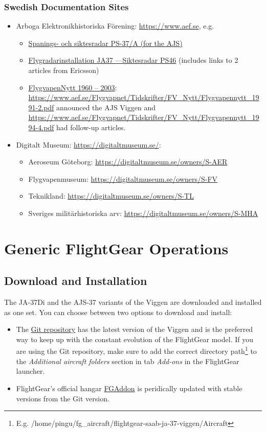 \subsection{Swedish Documentation Sites}
\begin{itemize}
\item Arboga Elektronikhistoriska Förening: \url{https://www.aef.se}, e.g. 
\begin{itemize}
\item \href{https://www.aef.se/Avionik/Notiser/PS-37/PS-37A.htm}{Spanings- och siktesradar PS-37/A (for the AJS)}
\item \href{https://www.aef.se/Avionik/Notiser/Siktesradar_PS-46_1.htm}{Flygradarinstallation JA37 ---Siktesradar PS46} (includes links to 2 articles from Ericsson)
\item \href{https://www.aef.se/Flygvapnet/Tidskrifter/FV_Nytt/FVN_oversikt.htm}{FlygvapenNytt 1960 – 2003}: \url{https://www.aef.se/Flygvapnet/Tidskrifter/FV_Nytt/Flygvapennytt_1991-2.pdf} announced the AJS Viggen and \url{https://www.aef.se/Flygvapnet/Tidskrifter/FV_Nytt/Flygvapennytt_1994-4.pdf} had follow-up articles.
\end{itemize}
\item Digitalt Museum: \url{https://digitaltmuseum.se/}:
\begin{itemize}
\item Aeroseum Göteborg: \url{https://digitaltmuseum.se/owners/S-AER}
\item Flygvapenmuseum: \url{https://digitaltmuseum.se/owners/S-FV}
\item Teknikland: \url{https://digitaltmuseum.se/owners/S-TL}
\item Sveriges militärhistoriska arv: \url{https://digitaltmuseum.se/owners/S-MHA}
\end{itemize}
\end{itemize} 


\chapter{Generic FlightGear Operations}
\section{Download and Installation}
The JA-37Di and the AJS-37 variants of the Viggen are downloaded and installed as one set. You can choose between two options to download and install:
\begin{itemize}
\item The \href{https://github.com/NikolaiVChr/flightgear-saab-ja-37-viggen}{Git repository} has the latest version of the Viggen and is the preferred way to keep up with the constant evolution of the FlightGear model. If you are using the Git repository, make sure to add the correct directory path\footnote{E.g. /home/pingu/fg\_aircraft/flightgear-saab-ja-37-viggen/Aircraft} to the \emph{Additional aircraft folders} section in tab \emph{Add-ons} in the FlightGear launcher.
\item FlightGear's official hangar \href{http://wiki.flightgear.org/FGAddon}{FGAddon} is peridically updated with stable versions from the Git version. 
\end{itemize}

